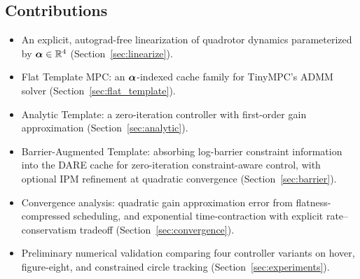 \subsection*{Contributions}
\begin{itemize}
  \item An explicit, autograd-free linearization of quadrotor
    dynamics parameterized by $\bm{\alpha} \in \mathbb{R}^4$
    (Section~\ref{sec:linearize}).
  \item Flat Template MPC: an $\bm{\alpha}$-indexed cache family for
    TinyMPC's ADMM solver (Section~\ref{sec:flat_template}).
  \item Analytic Template: a zero-iteration controller with
    first-order gain approximation (Section~\ref{sec:analytic}).
  \item Barrier-Augmented Template: absorbing log-barrier constraint
    information into the DARE cache for zero-iteration
    constraint-aware control, with optional IPM refinement
    at quadratic convergence (Section~\ref{sec:barrier}).
  \item Convergence analysis: quadratic gain approximation error
    from flatness-compressed scheduling, and exponential
    time-contraction with explicit rate--conservatism tradeoff
    (Section~\ref{sec:convergence}).
  \item Preliminary numerical validation comparing four controller
    variants on hover, figure-eight, and constrained circle tracking
    (Section~\ref{sec:experiments}).
\end{itemize}
